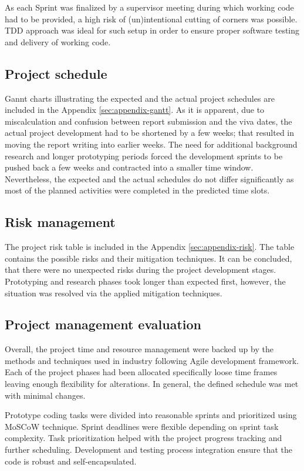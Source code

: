 		As each Sprint was finalized by a supervisor meeting during which working code had to be provided, a high risk of (un)intentional cutting of corners was possible. TDD approach was ideal for such setup in order to ensure proper software testing and delivery of working code.
		
	\subsection{Project schedule}
		Gannt charts illustrating the expected and the actual project schedules are included in the Appendix \ref{sec:appendix-gantt}. As it is apparent, due to miscalculation and confusion between report submission and the viva dates, the actual project development had to be shortened by a few weeks; that resulted in moving the report writing into earlier weeks. The need for additional background research and longer prototyping periods forced the development sprints to be pushed back a few weeks and contracted into a smaller time window. Nevertheless, the expected and the actual schedules do not differ significantly as most of the planned activities were completed in the predicted time slots.
		
	\subsection{Risk management}
		The project risk table is included in the Appendix \ref{sec:appendix-risk}. The table contains the possible risks and their mitigation techniques. It can be concluded, that there were no unexpected risks during the project development stages. Prototyping and research phases took longer than expected first, however, the situation was resolved via the applied mitigation techniques.
		
	\subsection{Project management evaluation}
		Overall, the project time and resource management were backed up by the methods and techniques used in industry following Agile development framework. Each of the project phases had been allocated specifically loose time frames leaving enough flexibility for alterations. In general, the defined schedule was met with minimal changes. 
		
		Prototype coding tasks were divided into reasonable sprints and prioritized using MoSCoW technique. Sprint deadlines were flexible depending on sprint task complexity. Task prioritization helped with the project progress tracking and further scheduling. Development and testing process integration ensure that the code is robust and self-encapsulated.
		
